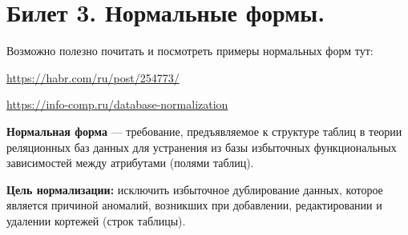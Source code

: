 \newpage
\section {Билет 3. Нормальные формы.}

Возможно полезно почитать и посмотреть примеры нормальных форм тут:

\url{https://habr.com/ru/post/254773/} 

\url{https://info-comp.ru/database-normalization}

\textbf{Нормальная форма} — требование, предъявляемое к структуре таблиц в теории реляционных баз данных для устранения из базы избыточных функциональных зависимостей между атрибутами (полями таблиц).

\textbf{Цель нормализации:} исключить избыточное дублирование данных, которое является причиной аномалий, возникших при добавлении, редактировании и удалении кортежей (строк таблицы).

